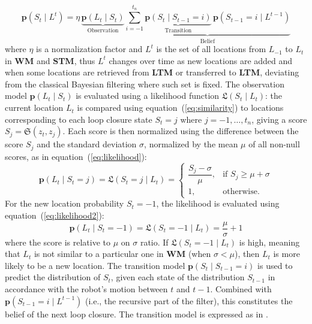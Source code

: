\begin{equation}
        \label{eq:bayesian_filter}
        \mathbf{p}(S_t \mid L^t)
        = \eta\,\underbrace{\mathbf{p}(L_t \mid S_t)}_{\text{Observation}}
            \underbrace{\sum_{i=-1}^{t_n}
            \underbrace{\mathbf{p}(S_t \mid S_{t-1}=i)}_{\text{Transition}}\,\mathbf{p}(S_{t-1}=i \mid L^{t-1})}_{\text{Belief}}
\end{equation}
where $\eta$ is a normalization factor and $L^t$ is the set of all locations from $L_{-1}$ to $L_t$ in \textbf{WM} and \textbf{STM}, thus $L^t$ changes over time as new locations are added and when some locations are retrieved from \textbf{LTM} or transferred to \textbf{LTM}, deviating from the classical Bayesian filtering where such set is fixed. 
The observation model $\mathbf{p}(L_t \mid S_t)$ is evaluated using a likelihood function $\mathfrak{L}(S_t \mid L_t)$: the current location $L_t$ is compared using equation~(\ref{eq:similarity}) to locations corresponding to each loop closure state $S_t = j$ where $j = -1, \ldots, t_n$, giving a score $S_j = \mathfrak{S}(z_t, z_j)$. Each score is then normalized using the difference between the score $S_j$ and the standard deviation $\sigma$, normalized by the mean $\mu$ of all non-null scores, as in equation~(\ref{eq:likelihood})\citep{angeli2008fast}:
\begin{equation}
    \label{eq:likelihood}
    \mathbf{p}(L_t \mid S_t = j) = \mathfrak{L}(S_t = j \mid L_t) = 
    \begin{cases}
        \dfrac{S_j - \sigma}{\mu}, & \text{if}\,\, S_j \ge \mu + \sigma \\
        1, & \text{otherwise}.
    \end{cases}
\end{equation}
For the new location probability $S_t = -1$, the likelihood is evaluated using equation~(\ref{eq:likelihood2}):
\begin{equation}
    \label{eq:likelihood2}
    \mathbf{p}(L_t \mid S_t = -1) = \mathfrak{L}(S_t = -1 \mid L_t) = \dfrac{\mu}{\sigma} + 1
\end{equation}
where the score is relative to $\mu$ on $\sigma$ ratio. If $\mathfrak{L}(S_t = -1 \mid L_t)$ is high, meaning that $L_t$ is not similar to a particular one in \textbf{WM} (when $\sigma < \mu$), then $L_t$ is more likely to be a new location.
The transition model $\mathbf{p}(S_t \mid S_{t-1} = i)$ is used to predict the distribution of $S_t$, given each state of the distribution $S_{t-1}$ in accordance with the robot's motion between $t$ and $t-1$. Combined with $\mathbf{p}(S_{t-1} = i \mid L^{t-1})$ (i.e., the recursive part of the filter), this constitutes the belief of the next loop closure. The transition model is expressed as in \citep{angeli2008fast}.
